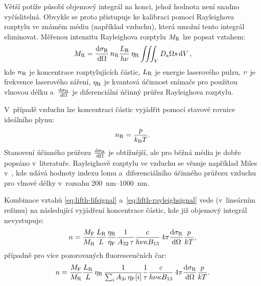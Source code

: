 Větší potíže působí objemový integrál na konci, jehož hodnota není snadno
vyčíslitelná.
Obvykle se proto přistupuje ke kalibraci pomocí Ray\-leigh\-ova rozptylu
ve známém médiu (například vzduchu),
která umožní tento integrál eliminovat.
Měřenou intenzitu Rayleighova rozptylu $M_\text{R}$ lze popsat vztahem:%
\autocite{lif-oh}
\begin{equation}
	\label{eq:lifth-rayleighsignal}
	M_\text{R} = \dv{\sigma_\text{R}}{\Omega} \, n_\text{R}
	\frac{L_\text{R}}{h\nu} \, \eta_\text{R}
	\iiint_V D_\text{a} \Omega s \dd{V},
\end{equation}
kde $n_\text{R}$ je koncentrace rozptylujících částic,
$L_\text{R}$ je energie laserového pulzu,
$\nu$ je frekvence laserového záření,
$\eta_\text{R}$ je kvantová účinnost snímače pro použitou vlnovou délku
a~$\dv{\sigma_\text{R}}{\Omega}$ je diferenciální účinný průřez Rayleighova rozptylu.

V~případě vzduchu lze koncentraci částic vyjádřit pomocí
stavové rovnice ideálního plynu:
\begin{equation}
	n_\text{R} = \frac{p}{k_\text{B}T}.
\end{equation}
Stanovení účinného průřezu $\dv{\sigma_\text{R}}{\Omega}$ je obtížnější,
ale pro běžná média je dobře popsáno v~literatuře.
Rayleighově rozptylu ve vzduchu se věnuje například Miles v~\cite{rayleigh},
kde udává hodnoty indexu lomu a~diferenciálního účinného průřezu vzduchu
pro vlnové délky v~rozsahu \SIrange{200}{1000}{\nano\metre}.

Kombinace vztahů \eqref{eq:lifth-lifsignal} a~\eqref{eq:lifth-rayleighsignal}
vede (v~lineárním režimu) na následující vyjádření koncentrace částic,
kde již objemový integrál nevystupuje:
\begin{equation}
	\label{eq:lifth-ndens}
	n = \frac{M_\text{F}}{M_\text{R}}
	\frac{L_\text{R}}{L}\frac{\eta_\text{R}}{\eta_\text{F}}
	\frac{1}{A_{32}\,\tau}
	\frac{c}{h\nu\kappa B_{13}}
	\, 4\pi \dv{\sigma_\text{R}}{\Omega} \frac{p}{kT},
\end{equation}
případně pro více pozorovaných fluorescenčních čar:
\begin{equation}
	\label{eq:lifth-ndens-multi}
	n = \frac{M_\text{F}}{M_\text{R}}
	\frac{L_\text{R}}{L} \, \eta_\text{R}
	\, \frac{1}{\sum_i A_{3i}\,\eta_\text{F}[i]}
	\frac{1}{\tau}
	\frac{c}{h\nu\kappa B_{13}}
	\, 4\pi \dv{\sigma_\text{R}}{\Omega} \frac{p}{kT}.
\end{equation}

